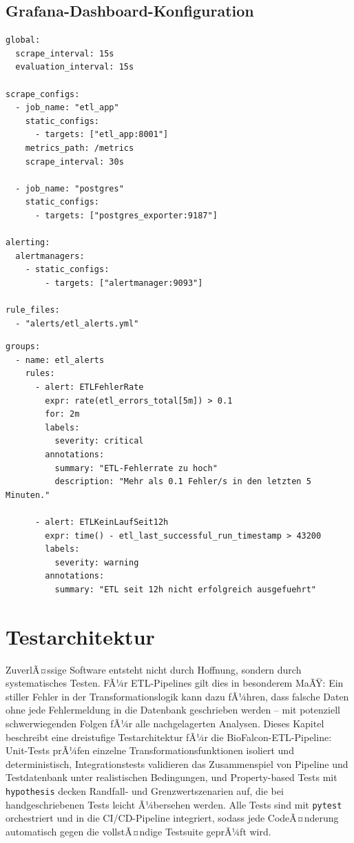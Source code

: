 ﻿\documentclass[12pt,a4paper]{report}
\theoremstyle{definition}
\theoremstyle{remark}
\newcommand{\code}[1]{\texttt{#1}}
\begin{document}
\section{Grafana-Dashboard-Konfiguration}

\begin{lstlisting}[style=yaml, caption={monitoring/prometheus.yml: Scrape-Konfiguration}]
global:
  scrape_interval: 15s
  evaluation_interval: 15s

scrape_configs:
  - job_name: "etl_app"
    static_configs:
      - targets: ["etl_app:8001"]
    metrics_path: /metrics
    scrape_interval: 30s

  - job_name: "postgres"
    static_configs:
      - targets: ["postgres_exporter:9187"]

alerting:
  alertmanagers:
    - static_configs:
        - targets: ["alertmanager:9093"]

rule_files:
  - "alerts/etl_alerts.yml"
\end{lstlisting}

\begin{lstlisting}[style=yaml, caption={alerts/etl\_alerts.yml: Alerting-Regeln}]
groups:
  - name: etl_alerts
    rules:
      - alert: ETLFehlerRate
        expr: rate(etl_errors_total[5m]) > 0.1
        for: 2m
        labels:
          severity: critical
        annotations:
          summary: "ETL-Fehlerrate zu hoch"
          description: "Mehr als 0.1 Fehler/s in den letzten 5 Minuten."

      - alert: ETLKeinLaufSeit12h
        expr: time() - etl_last_successful_run_timestamp > 43200
        labels:
          severity: warning
        annotations:
          summary: "ETL seit 12h nicht erfolgreich ausgefuehrt"
\end{lstlisting}

\chapter{Testarchitektur}
\label{sec:testing}

ZuverlÃ¤ssige Software entsteht nicht durch Hoffnung, sondern durch systematisches Testen. FÃ¼r ETL-Pipelines gilt dies in besonderem MaÃŸ: Ein stiller Fehler in der Transformationslogik kann dazu fÃ¼hren, dass falsche Daten ohne jede Fehlermeldung in die Datenbank geschrieben werden -- mit potenziell schwerwiegenden Folgen fÃ¼r alle nachgelagerten Analysen. Dieses Kapitel beschreibt eine dreistufige Testarchitektur fÃ¼r die BioFalcon-ETL-Pipeline: Unit-Tests prÃ¼fen einzelne Transformationsfunktionen isoliert und deterministisch, Integrationstests validieren das Zusammenspiel von Pipeline und Testdatenbank unter realistischen Bedingungen, und Property-based Tests mit \code{hypothesis} decken Randfall- und Grenzwertszenarien auf, die bei handgeschriebenen Tests leicht Ã¼bersehen werden. Alle Tests sind mit \code{pytest} orchestriert und in die CI/CD-Pipeline integriert, sodass jede CodeÃ¤nderung automatisch gegen die vollstÃ¤ndige Testsuite geprÃ¼ft wird.
\end{document}
